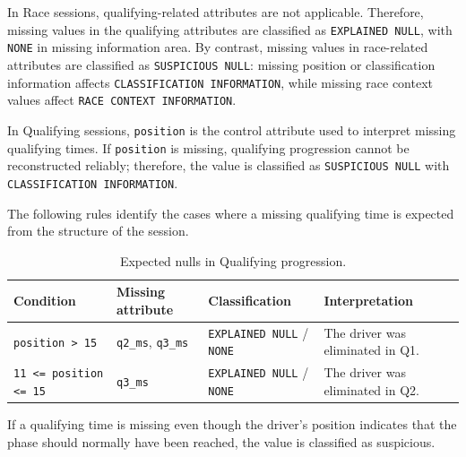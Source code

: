 \documentclass[11pt,a4paper]{article}
\begin{document}
	In Race sessions, qualifying-related attributes are not applicable. 
	Therefore, missing values in the qualifying attributes are classified as \texttt{EXPLAINED NULL}, with \texttt{NONE} in missing information area. 
	By contrast, missing values in race-related attributes are classified as \texttt{SUSPICIOUS NULL}: missing position or classification information affects \texttt{CLASSIFICATION INFORMATION}, while missing race context values affect \texttt{RACE CONTEXT INFORMATION}.
	
	\vspace{1.5em}
	In Qualifying sessions, \texttt{position} is the control attribute used to interpret missing qualifying times. 
	If \texttt{position} is missing, qualifying progression cannot be reconstructed reliably; therefore, the value is classified as \texttt{SUSPICIOUS NULL} with \texttt{CLASSIFICATION INFORMATION}.
	
	The following rules identify the cases where a missing qualifying time is expected from the structure of the session.
	

	\begin{table}[H]
		\centering
		\small
		\caption{Expected nulls in Qualifying progression.}
		\label{tab:qualifying-expected-null-rules}
		\begin{tabularx}{0.95\linewidth}{
				>{\raggedright\arraybackslash}p{3.7cm}
				>{\raggedright\arraybackslash}p{3.1cm}
				>{\raggedright\arraybackslash}p{3cm}
				>{\raggedright\arraybackslash}X
			}
			\toprule
			\textbf{Condition}
			& \textbf{Missing attribute}
			& \textbf{Classification}
			& \textbf{Interpretation} \\
			\midrule
			
			\texttt{position > 15}
			& \texttt{q2\_ms}, \texttt{q3\_ms}
			& \texttt{EXPLAINED NULL} / \texttt{NONE}
			& The driver was eliminated in Q1. \\
			
			\midrule
			
			\texttt{11 <= position <= 15}
			& \texttt{q3\_ms}
			& \texttt{EXPLAINED NULL} / \texttt{NONE}
			& The driver was eliminated in Q2. \\
			
			\bottomrule
		\end{tabularx}
	\end{table}
	
	If a qualifying time is missing even though the driver's position indicates that the phase should normally have been reached, the value is classified as suspicious.
	
\end{document}
